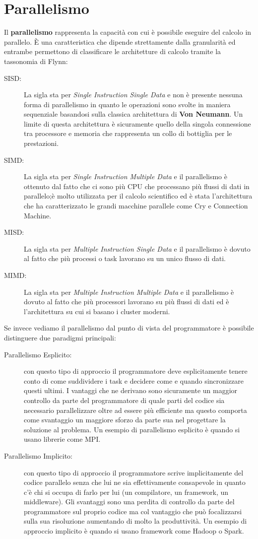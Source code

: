 \section{Parallelismo}
Il \textbf{parallelismo} rappresenta la capacità con cui è possibile eseguire del calcolo in parallelo. È una caratteristica che dipende strettamente dalla granularità ed entrambe permettono di classificare le architetture di calcolo tramite la tassonomia di Flynn:
\begin{description}
  \item[SISD:] La sigla sta per \textit{Single Instruction Single Data} e non è presente nessuna forma di parallelismo in quanto le operazioni sono svolte in maniera sequenziale basandosi sulla classica architettura di \textbf{Von Neumann}. Un limite di questa architettura è sicuramente quello della singola connessione tra processore e memoria che rappresenta un collo di bottiglia per le prestazioni.
  \item[SIMD:] La sigla sta per \textit{Single Instruction Multiple Data} e il parallelismo è ottenuto dal fatto che ci sono più CPU che processano più flussi di dati in parallelo;è molto utilizzata per il calcolo scientifico ed è stata l'architettura che ha caratterizzato le grandi macchine parallele come Cry e Connection Machine.
  \item[MISD:] La sigla sta per \textit{Multiple Instruction Single Data} e il parallelismo è dovuto al fatto che più processi o task lavorano su un unico flusso di dati.
  \item[MIMD:] La sigla sta per \textit{Multiple Instruction Multiple Data} e il parallelismo è dovuto al fatto che più processori lavorano su più flussi di dati ed è l'architettura su cui si basano i cluster moderni.
\end{description}
Se invece vediamo il parallelismo dal punto di vista del programmatore è possibile distinguere due paradigmi principali:
\begin{description}
  \item[Parallelismo Esplicito:]con questo tipo di approccio il programmatore deve esplicitamente tenere conto di come suddividere i task e decidere come e quando sincronizzare questi ultimi. I vantaggi che ne derivano sono sicuramente un maggior controllo da parte del programmatore di quale parti del codice sia necessario parallelizzare oltre ad essere più efficiente ma questo comporta come svantaggio un maggiore sforzo da parte sua nel progettare la soluzione al problema. Un esempio di parallelismo esplicito è quando si usano librerie come MPI.
  \item[Parallelismo Implicito:] con questo tipo di approccio il programmatore scrive implicitamente del codice parallelo senza che lui ne sia effettivamente consapevole in quanto c'è chi si occupa di farlo per lui (un compilatore, un framework, un middleware). Gli svantaggi sono una perdita di controllo da parte del programmatore sul proprio codice ma col vantaggio che può focalizzarsi sulla sua risoluzione aumentando di molto la produttività. Un esempio di approccio implicito è quando si usano framework come Hadoop o Spark.
\end{description}
